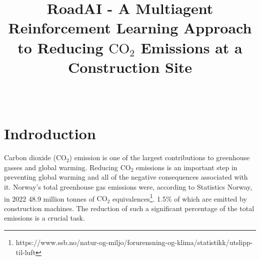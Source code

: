 \documentclass[conference]{IEEEtran}
\begin{document}
\newcommand{\coo}{\ensuremath{\mathrm{CO_2}}}

\title{RoadAI - A Multiagent Reinforcement Learning Approach to Reducing \coo{} Emissions at a Construction Site}



\author{
	\and
	\and
	\and \\
}

\maketitle





\section{Indroduction}
Carbon dioxide (\coo{}) emission is one of the largest contributions to greenhouse gasses and global warming.
Reducing \coo{} emissions is an important step in preventing global warming and all of the negative
consequences associated with it. Norway's total greenhouse gas emissions were, according to Statistics
Norway, in 2022 48.9 million tonnes of \coo{}
equivalences\footnote{https://www.ssb.no/natur-og-miljo/forurensning-og-klima/statistikk/utslipp-til-luft}.
1.5\% of which are emitted by construction machines. \cite{noraRoadAIReducing} The reduction of such
a significant percentage of the total emissions is a crucial task.
\end{document}
